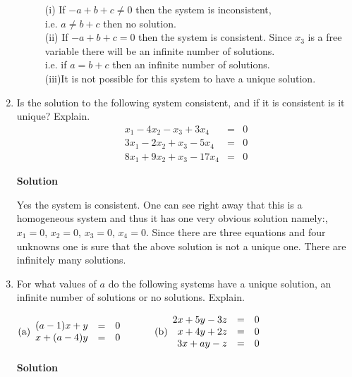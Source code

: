 \begin{enumerate}
\begin{description}
\noindent (i) If $-a+b+c \neq 0$ then the system is inconsistent,
\\i.e. $a \neq b+c$ then no solution.
\\
\noindent (ii) If $-a+b+c=0$ then the system is consistent.  Since
$x_{3}$ is a free variable there will be an infinite number of
solutions.
\\i.e. if $a=b+c$ then an infinite number of solutions.
\\
\noindent (iii)It is not possible for this system to have a unique
solution.
\end{description}
\item Is the solution to the following system
consistent, and if it is consistent is it unique? Explain.
\begin{eqnarray*}
                x_1-4x_2-x_3+3x_4&=&0\\
                3x_1-2x_2+x_3-5x_4&=&0\\
                8x_1+9x_2+x_3-17x_4&=&0
\end{eqnarray*}

\noindent \textbf{Solution}

\noindent Yes the system is consistent.  One can see right away
that this is a homogeneous system and thus it has one very obvious
solution namely:, $x_{1}=0$, $x_{2}=0$, $x_{3}=0$, $x_{4}=0$.
Since there are three equations and four unknowns one is sure that
the above solution is not a unique one. There are infinitely many
solutions.

\item For what values of $a$ do the following systems have a unique solution,
an infinite number of solutions or no solutions. Explain.

$\rm{(a)} \begin{array}{rrr}
            (a-1)x+y&=&0\\
            x+(a-4)y&=&0 \end{array} \quad \quad \quad
\rm{(b)} \begin{array}{rrr}
            2x+5y-3z&=&0\\
            x+4y+2z&=&0\\
            3x+ay-z&=&0 \end{array} $

\noindent \textbf{Solution}
\end{enumerate}
